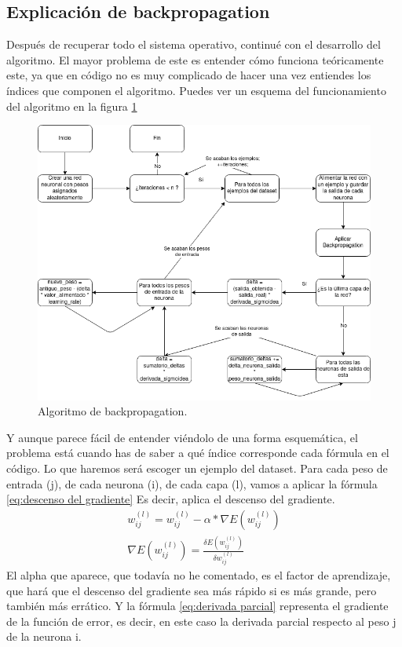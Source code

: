 \subsection{Explicación de backpropagation}
Después de recuperar todo el sistema operativo, continué con el desarrollo del algoritmo. El mayor problema de este es entender cómo funciona teóricamente este, ya que en código no es muy complicado de hacer una vez entiendes los índices que componen el algoritmo. Puedes ver un esquema  del funcionamiento del algoritmo en la figura \ref{Algoritmo de backpropagation}
\begin{figure}[h]
	\centering
	\includegraphics[width=15cm]{archivos/imagenes/Algoritmo-de-backpropagation.png}
	\caption{Algoritmo de backpropagation.}
	\label{Algoritmo de backpropagation}
\end{figure}

Y aunque parece fácil de entender viéndolo de una forma esquemática, el problema está cuando has de saber a qué índice corresponde cada fórmula en el código. Lo que haremos será escoger un ejemplo del dataset. Para cada peso de entrada (j), de cada neurona (i), de cada capa (l), vamos a aplicar la fórmula \ref{eq:descenso del gradiente} Es decir, aplica el descenso del gradiente.
\begin{subequations}
	\begin{eqnarray}
		w_{ij}^{(l)} = w_{ij}^{(l)} - \alpha*\nabla E(w_{ij}^{(l)}) \label{eq:descenso del gradiente} \\
		\nabla E(w_{ij}^{(l)}) =  \frac{\delta E(w_{ij}^{(l)})}{\delta w_{ij}^{(l)}} \label{eq:derivada parcial}
	\end{eqnarray}
\end{subequations}
El alpha que aparece, que todavía no he comentado, es el factor de aprendizaje, que hará que el descenso del gradiente sea más rápido si es más grande, pero también más errático. Y la fórmula \ref{eq:derivada parcial} representa el gradiente de la función de error, es decir, en este caso la derivada parcial respecto al peso j de la neurona i.

